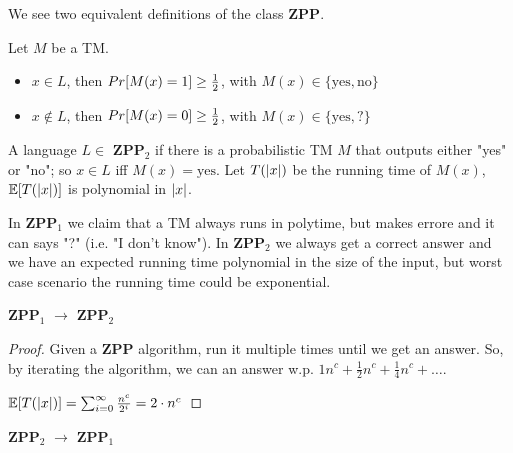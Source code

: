         We see two equivalent definitions of the class \textbf{ZPP}.

        \begin{definition}\label{def:zpp1}
            Let $M$ be a TM.\@
            \begin{itemize}
                \item $x \in L$, then $Pr [M(x) = 1] \geq \frac{1}{2}$, with $M(x) \in \{ \text{yes}, \text{no} \}$
                \item $x \not\in L$, then $Pr [M(x) = 0] \geq \frac{1}{2}$, with $M(x) \in \{ \text{yes}, \text{?} \}$
            \end{itemize}
        \end{definition}

        \begin{definition}\label{def:zpp2}
            A language $L \in$ \textbf{ZPP}$_2$ if there is a probabilistic TM $M$ that outputs either "yes" or "no"; so $x \in L$ iff $M(x) = \text{yes}$.
            Let $T(\vert x \vert)$ be the running time of $M(x)$, $\mathbb{E}[T(\vert x \vert)]$ is polynomial in $\vert x \vert$.
        \end{definition}

        In \textbf{ZPP}$_1$ we claim that a TM always runs in polytime, but makes errore and it can says "?" (i.e. "I don't know").
        In \textbf{ZPP}$_2$ we always get a correct answer and we have an expected running time polynomial in the size of the input, but worst case scenario the running time could be exponential.


        \begin{lemma}\label{lemma:zpp1_zpp2}
            \textbf{ZPP}$_1$ $\rightarrow$ \textbf{ZPP}$_2$
        \end{lemma}

        \begin{proof}
            Given a \textbf{ZPP} algorithm, run it multiple times until we get an answer.
            So, by iterating the algorithm, we can an answer w.p. $1 n^c + \frac{1}{2} n^c + \frac{1}{4} n^c + \dots$.

            $\mathbb{E}[T(\vert x \vert)] = \sum_{i=0}^{\infty}\frac{n^c}{2^i} = 2 \cdot n^c$
        \end{proof}

        \begin{lemma}\label{lemma:zpp2_zpp1}
            \textbf{ZPP}$_2$ $\rightarrow$ \textbf{ZPP}$_1$
        \end{lemma}

